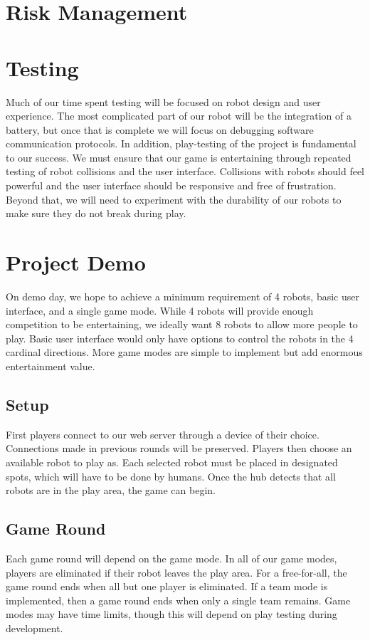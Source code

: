 \documentclass[11pt]{ieeeconf}
\begin{document}
\section{Risk Management}

\section{Testing}
Much of our time spent testing will be focused on robot design and user experience. The most complicated part of our robot will be the integration of a battery, but once that is complete we will focus on debugging software communication protocols. In addition, play-testing of the project is fundamental to our success. We must ensure that our game is entertaining through repeated testing of robot collisions and the user interface. Collisions with robots should feel powerful and the user interface should be responsive and free of frustration. Beyond that, we will need to experiment with the durability of our robots to make sure they do not break during play.

\section{Project Demo}

On demo day, we hope to achieve a minimum requirement of 4 robots, basic user interface, and a single game mode. While 4 robots will provide enough competition to be entertaining, we ideally want 8 robots to allow more people to play. Basic user interface would only have options to control the robots in the 4 cardinal directions. More game modes are simple to implement but add enormous entertainment value.

\subsection{Setup}
First players connect to our web server through a device of their choice. Connections made in previous rounds will be preserved. Players then choose an available robot to play as. Each selected robot must be placed in designated spots, which will have to be done by humans. Once the hub detects that all robots are in the play area, the game can begin. 

\subsection{Game Round}
Each game round will depend on the game mode. In all of our game modes, players are eliminated if their robot leaves the play area. For a free-for-all, the game round ends when all but one player is eliminated. If a team mode is implemented, then a game round ends when only a single team remains. Game modes may have time limits, though this will depend on play testing during development.
\end{document}
